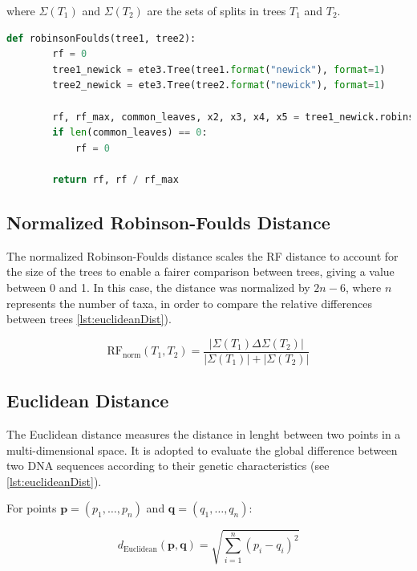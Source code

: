 where $\Sigma(T_1)$ and $\Sigma(T_2)$ are the sets of splits in trees $T_1$ and $T_2$.

\begin{lstlisting}[label=lst:robinsonFoulds,language=Python,caption=Python script for calculating the Robinson-Foulds distance using the ete3 package in the aPhyloGeo package]
    def robinsonFoulds(tree1, tree2):
        rf = 0
        tree1_newick = ete3.Tree(tree1.format("newick"), format=1)
        tree2_newick = ete3.Tree(tree2.format("newick"), format=1)

        rf, rf_max, common_leaves, x2, x3, x4, x5 = tree1_newick.robinson_foulds(tree2_newick, unrooted_trees=True)
        if len(common_leaves) == 0:
            rf = 0

        return rf, rf / rf_max
\end{lstlisting}


\subsection{Normalized Robinson-Foulds Distance}\label{RFnorm}
The normalized Robinson-Foulds distance scales the RF distance to account for the size of the trees to enable a fairer comparison between trees, giving a value between 0 and 1. In this case, the distance was normalized by $2n-6$, where $n$ represents the number of taxa, in order to compare the relative differences between trees \autoref{lst:euclideanDist}).

\begin{equation}
    \text{RF}_{\text{norm}}(T_1, T_2) = \frac{| \Sigma(T_1) \Delta \Sigma(T_2) |}{| \Sigma(T_1) | + | \Sigma(T_2) |}
\end{equation}

\subsection{Euclidean Distance}\label{euclidean}
The Euclidean distance measures the distance in lenght between two points in a multi-dimensional space. It is adopted to evaluate the global difference between two DNA sequences according to their genetic characteristics (see \autoref{lst:euclideanDist}).

For points $\mathbf{p} = (p_1, \ldots, p_n)$ and $\mathbf{q} = (q_1, \ldots, q_n)$:

\begin{equation}
    d_{\text{Euclidean}}(\mathbf{p}, \mathbf{q}) = \sqrt{\sum_{i=1}^{n} (p_i - q_i)^2}
\end{equation}

